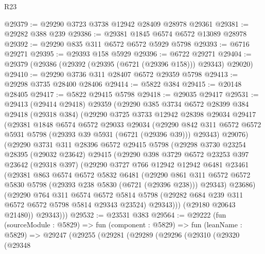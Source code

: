 \begin{lexlean}{R23}
\begin{coremodule}
@29379 := @29290 @3723 @3738 @12942 @28409 @28978 @29361
@29381 := @29282 @388 @239
@29386 := @29381 @1845 @6574 @6572 @13089 @28978
@29392 := @29290 @835 @311 @6572 @6572 @5929 @5798
@29393 := @6716 @29271
@29395 := @29393 @158 @5929
@29396 := @6722 @29271
@29404 := @29379 (@29386 (@29392 (@29395 (@6721 (@29396 @158))) @29343) @29020)
@29410 := @29290 @3736 @311 @28407 @6572 @29359 @5798
@29413 := @29298 @3735 @28400 @28406
@29414 := @5822 @384
@29415 := @20148 @28405
@29417 := @5822 @29415 @5798
@29418 := @29035 @29417
@29531 := @29413
    (@29414 @29418)
    @29359
    (@29290
      @385
      @3734
      @6572
      @28399
      @384
      @29418
      (@29318 @384)
      (@29290
        @3725
        @3733
        @12942
        @28398
        @29034
        @29417
        (@29381
          @1848
          @6574
          @6572
          @29033
          @29034
          (@29290 @842 @311 @6572 @6572 @5931 @5798 (@29393 @39 @5931 (@6721 (@29396 @39))) @29343)
          @29076)
        (@29290
          @3731
          @311
          @28396
          @6572
          @29415
          @5798
          (@29298
            @3730
            @23254
            @28395
            (@29032 @23642)
            @29415
            (@29290
              @398
              @3729
              @6572
              @23253
              @397
              @23642
              (@29318 @397)
              (@29290
                @3727
                @766
                @12942
                @12942
                @6481
                @23461
                (@29381
                  @863
                  @6574
                  @6572
                  @5832
                  @6481
                  (@29290
                    @861
                    @311
                    @6572
                    @6572
                    @5830
                    @5798
                    (@29393 @238 @5830 (@6721 (@29396 @238)))
                    @29343)
                  @23686)
                (@29290
                  @764
                  @311
                  @6574
                  @6572
                  @5814
                  @5798
                  (@29282 @684 @239 @311 @6572 @6572 @5798 @5814 @29343 @23524)
                  @29343)))
            (@29180 @20643 @21480))
          @29343)))
@29532 := @23531 @383
@29564 := @29222
    (fun (sourceModule : @5829) =>
    fun (component : @5829) =>
    fun (leanName : @5829) =>
    @29247
      (@29255
        (@29281
          (@29289
            (@29296
              (@29310
                (@29320
                  (@29348

\end{coremodule}
\end{lexlean}

